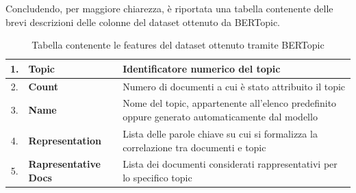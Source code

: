 Concludendo, per maggiore chiarezza, è riportata una tabella contenente delle brevi descrizioni delle colonne del dataset ottenuto da BERTopic.
\begin{table}[H]
    \begin{tabularx}{\textwidth}{|c|X|X|}
        \hline
        \small 1. & \small \textbf{Topic} & \small Identificatore numerico del topic \\
        \hline
        \small 2. & \small \textbf{Count} & \small Numero di documenti a cui è stato attribuito il topic \\
        \hline
        \small 3. & \small \textbf{Name} & \small Nome del topic, appartenente all'elenco predefinito oppure generato automaticamente dal modello \\
        \hline
        \small 4. & \small \textbf{Representation} & \small Lista delle parole chiave su cui si formalizza la correlazione tra documenti e topic \\
        \hline
        \small 5. & \small \textbf{Rapresentative Docs} & \small Lista dei documenti considerati rappresentativi per lo specifico topic \\
        \hline
    \end{tabularx}
    \caption{Tabella contenente le features del dataset ottenuto tramite BERTopic}
\end{table}